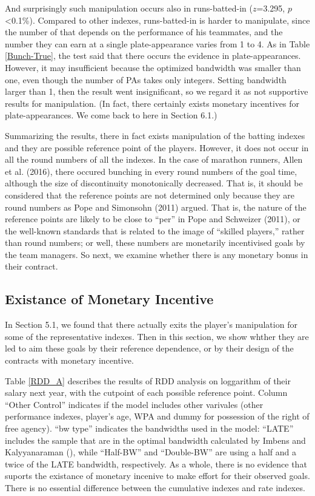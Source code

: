 \documentclass[dvipdfmx, 12pt]{article}
\begin{document}
And surprisingly such manipulation occurs also in runs-batted-in ($z$=3.295, $p$<0.1\%). Compared to other indexes, runs-batted-in is harder to manipulate, since the number of that depends on the performance of his teammates, and the number they can earn at a single plate-appearance varies from 1 to 4. As in Table \ref{Bunch-True}, the test said that there occurs the evidence in plate-appearances. However, it may insufficient because the optimized bandwidth was smaller than one, even though the number of PAs takes only integers. Setting bandwidth larger than 1, then the result went insignificant, so we regard it as not supportive results for manipulation. (In fact, there certainly exists monetary incentives for plate-appearances. We come back to here in Section 6.1.)

Summarizing the results, there in fact exists manipulation of the batting indexes and they are possible reference point of the players. However, it does not occur in all the round numbers of all the indexes. In the case of marathon runners, Allen et al. (2016), there occured bunching in every round numbers of the goal time, although the size of discontinuity monotonically decreased. That is, it should be considered that the reference points are not determined only because they are round numbers as Pope and Simonsohn (2011) argued. That is, the nature of the reference points are likely to be close to ``per'' in Pope and Schweizer (2011), or the well-known standards that is related to the image of ``skilled players,'' rather than round numbers; or well, these numbers are monetarily incentivised goals by the team managers. So next, we examine whether there is any monetary bonus in their contract.

\subsection{Existance of Monetary Incentive}

In Section 5.1, we found that there actually exits the player's manipulation for some of the representative indexes. Then in this section, we show whther they are led to aim these goals by their reference dependence, or by their design of the contracts with monetary incentive.

Table \ref{RDD_A} describes the results of RDD analysis on loggarithm of their salary next year, with the cutpoint of each possible reference point. Column ``Other Control'' indicates if the model includes other varivales (other performance indexes, player's age, WPA and dummy for possession of the right of free agency). ``bw type'' indicates the bandwidths used in the model: ``LATE'' includes the sample that are in the optimal bandwidth calculated by Imbens and Kalyyanaraman (), while ``Half-BW'' and ``Double-BW'' are using a half and a twice of the LATE bandwidth, respectively. As a whole, there is no evidence that suports the existance of monetary incenive to make effort for their observed goals. There is no essential difference between the cumulative indexes and rate indexes.
\end{document}
